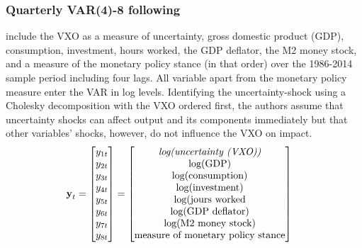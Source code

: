 \documentclass[a4paper,11pt,listof=nochaptergap,oneside,pointednumbers,bibtotoc,bigheadings,liststotoc,hidelinks]{scrbook}
\theoremstyle{mysatz}
\theoremstyle{mydefinition}
\theoremstyle{mytheorem}
\theoremstyle{mybemerkung}
\newcommand{\vect}[1]{\boldsymbol{\mathbf{#1}}}
\begin{document}
\subsubsection{Quarterly VAR(4)-8 following \citet{basuandbundick:17}}
\citet{basuandbundick:17} include the VXO as a measure of uncertainty, gross domestic product (GDP), consumption, investment, hours worked, the GDP deflator, the M2 money stock, and a measure of the monetary policy stance (in that order) over the 1986-2014 sample period including four lags. All variable apart from the monetary policy measure enter the VAR in log levels. Identifying the uncertainty-shock using a Cholesky decomposition with the VXO ordered first, the authors assume that uncertainty shocks can affect output and its components immediately but that other variables' shocks, however, do not influence the VXO on impact. 
\begin{equation} \label{eq:VAR22}
\begin{split}
\vect{y}_t & = 
 \begin{bmatrix} 
 		y_{1t} \\
		y_{2t} \\
		y_{3t} \\
		y_{4t} \\
		y_{5t} \\
		y_{6t} \\
		y_{7t} \\
		y_{8t} 
	      \end{bmatrix} = 	      
	      \begin{bmatrix} \text{\textit{log(uncertainty (VXO))}} \\ 
				      \text{log(GDP)}\\ 
				      \text{log(consumption)}\\
				      \text{log(investment)}\\ 
				      \text{log(jours worked}\\
				      \text{log(GDP deflator)}\\
				      \text{log(M2 money stock)} \\
				      \text{measure of monetary policy stance}
	      \end{bmatrix}
\end{split}
\end{equation}
\end{document}

